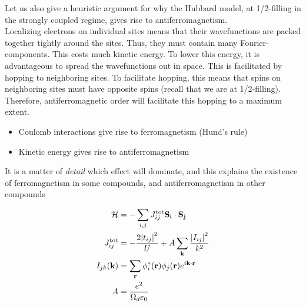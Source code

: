 Let us also give a heuristic argument for why the Hubbard model, at 1/2-filling in the strongly coupled regime, gives rise to antiferromagnetism. \\

Localizing electrons on individual sites means that their wavefunctions are packed together tightly around the sites. Thus, they must contain many Fourier-components. This costs much kinetic energy. To lower this energy, it is advantageous to spread the wavefunctions out in space. This is facilitated by hopping to neighboring sites. To facilitate hopping, this means that spins on neighboring sites must have opposite spins (recall that we are at 1/2-filling). Therefore, antiferromagnetic order will facilitate this hopping to a maximum extent.

\begin{itemize}
	\item Coulomb interactions give rise to ferromagnetism (Hund's rule)
	
	\item Kinetic energy gives rise to antiferromagnetism
\end{itemize}

\begin{tcolorbox}
	It is a matter of \emph{detail} which effect will dominate, and this explains the existence of ferromagnetism in some compounds, and antiferromagnetism in other compounds
\end{tcolorbox}

\begin{align}
	\mathcal{H} &= -\sum_{i, j} J_{ij}^{\text{tot}} \vb{S_i} \cdot \vb{S_j} \\
	J_{ij}^{\text{tot}} &= - \frac{2\abs{t_{ij}}^2}{U} + A\sum_{\vb{k}}\frac{\abs{I_{ij}}^2}{k^2} \\
	I_{jk}(\vb{k}) &= \sum_{\vb{r}}\phi_i^*(\vb{r})\phi_j(\vb{r}) e^{i\vb{k} \cdot \vb{r}} \\
	A &= \frac{e^2}{\Omega_d \varepsilon_0}
\end{align}

